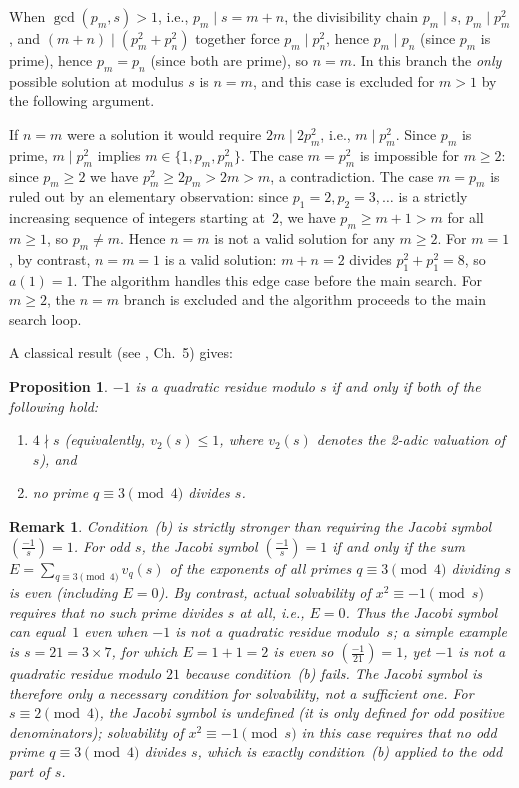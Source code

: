 \documentclass[pdflatex,sn-mathphys-num,Numbered]{sn-jnl}
\theoremstyle{thmstyleone}
\newtheorem{proposition}[theorem]{Proposition}
\theoremstyle{thmstylethree}
\theoremstyle{thmstyletwo}
\newtheorem{remark}[theorem]{Remark}
\numberwithin{equation}{section}
\begin{document}
When $\gcd(p_m, s) > 1$, i.e., $p_m \mid s = m+n$, the divisibility
chain $p_m \mid s$, $p_m \mid p_m^2$, and $(m+n) \mid (p_m^2 + p_n^2)$
together force $p_m \mid p_n^2$, hence $p_m \mid p_n$ (since $p_m$ is
prime), hence $p_m = p_n$ (since both are prime), so $n = m$.
In this branch the \emph{only} possible solution at modulus $s$ is
$n = m$, and this case is excluded for $m > 1$ by the following
argument.

If $n = m$ were a solution it would require $2m \mid 2p_m^2$,
i.e., $m \mid p_m^2$.
Since $p_m$ is prime, $m \mid p_m^2$ implies $m \in \{1, p_m, p_m^2\}$.
The case $m = p_m^2$ is impossible for $m \geq 2$: since $p_m \geq 2$
we have $p_m^2 \geq 2p_m > 2m > m$, a contradiction.
The case $m = p_m$ is ruled out by an elementary observation: since
$p_1 = 2, p_2 = 3, \ldots$ is a strictly increasing sequence of
integers starting at~$2$, we have $p_m \geq m + 1 > m$ for all
$m \geq 1$, so $p_m \neq m$.
Hence $n = m$ is not a valid solution for any $m \geq 2$.
For $m = 1$, by contrast, $n = m = 1$ is a valid solution: $m + n = 2$
divides $p_1^2 + p_1^2 = 8$, so $a(1) = 1$.
The algorithm handles this edge case before the main search.
For $m \geq 2$, the $n = m$ branch is excluded and the algorithm
proceeds to the main search loop.

A classical result (see \cite{IrelandRosen}, Ch.~5) gives:

\begin{proposition}\label{prop:qr}
	$-1$ is a quadratic residue modulo $s$ if and only if both of the
	following hold:
	\begin{enumerate}
		\item[(a)] $4 \nmid s$ \textup{(}equivalently, $v_2(s) \leq 1$,
		where $v_2(s)$ denotes the 2-adic valuation of $s$\textup{)}, and
		\item[(b)] no prime $q \equiv 3 \pmod{4}$ divides $s$.
	\end{enumerate}
\end{proposition}

\begin{remark}\label{rem:jacobi}
	Condition~(b) is strictly stronger than requiring the Jacobi symbol
	$\left(\frac{-1}{s}\right) = 1$.
	For odd $s$, the Jacobi symbol $\left(\frac{-1}{s}\right) = 1$ if and
	only if the \emph{sum} $E = \sum_{q \equiv 3 \pmod{4}} v_q(s)$ of the
	exponents of all primes $q \equiv 3 \pmod{4}$ dividing $s$ is even
	(including $E = 0$).
	By contrast, actual solvability of $x^2 \equiv -1 \pmod{s}$ requires
	that no such prime divides $s$ at all, i.e., $E = 0$.
	Thus the Jacobi symbol can equal~$1$ even when $-1$ is \emph{not} a
	quadratic residue modulo~$s$; a simple example is $s = 21 = 3 \times 7$,
	for which $E = 1 + 1 = 2$ is even so $\left(\frac{-1}{21}\right) = 1$,
	yet $-1$ is not a quadratic residue modulo $21$ because condition~(b)
	fails.
	The Jacobi symbol is therefore only a necessary condition for
	solvability, not a sufficient one.
	For $s \equiv 2 \pmod{4}$, the Jacobi symbol is undefined (it is only
	defined for odd positive denominators); solvability of
	$x^2 \equiv -1 \pmod{s}$ in this case requires that no odd prime
	$q \equiv 3 \pmod{4}$ divides $s$, which is exactly condition~(b)
	applied to the odd part of $s$.
\end{remark}
\end{document}
